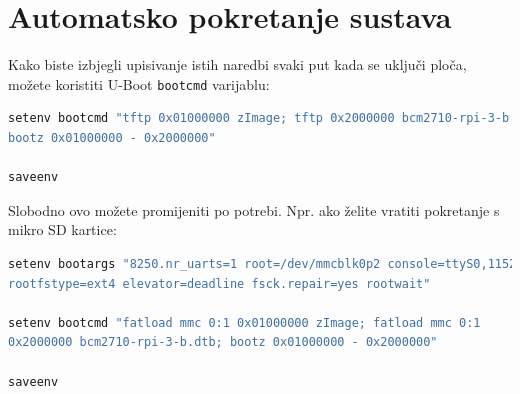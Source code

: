 \documentclass[11pt]{article}
\begin{document}
\section{Automatsko pokretanje sustava}
Kako biste izbjegli upisivanje istih naredbi svaki put kada se uključi ploča,
 možete koristiti U-Boot \texttt{bootcmd} varijablu:
\begin{lstlisting}[language=bash]
setenv bootcmd "tftp 0x01000000 zImage; tftp 0x2000000 bcm2710-rpi-3-b.dtb;
bootz 0x01000000 - 0x2000000"

saveenv
\end{lstlisting}
Slobodno ovo možete promijeniti po potrebi. Npr. ako želite vratiti pokretanje
 s mikro SD kartice:
\begin{lstlisting}[language=bash]
setenv bootargs "8250.nr_uarts=1 root=/dev/mmcblk0p2 console=ttyS0,115200
rootfstype=ext4 elevator=deadline fsck.repair=yes rootwait"

setenv bootcmd "fatload mmc 0:1 0x01000000 zImage; fatload mmc 0:1
0x2000000 bcm2710-rpi-3-b.dtb; bootz 0x01000000 - 0x2000000"

saveenv
\end{lstlisting}
\end{document}
